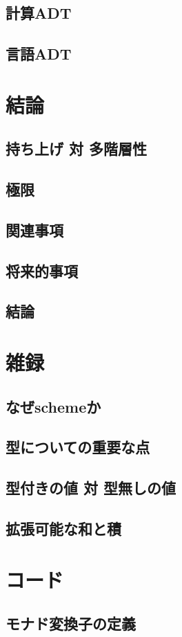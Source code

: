 \documentclass[11pt, oneside]{jsarticle}   	%
\begin{document}
\subsection{ 計算ADT }
\subsection{ 言語ADT }
\section{ 結論 }
\subsection{ 持ち上げ 対 多階層性 }
\subsection{ 極限 }
\subsection{ 関連事項 }
\subsection{ 将来的事項 }
\subsection{ 結論 }

\renewcommand{\thesection}{\Alph{section}}
\renewcommand{\thesubsection}{\thesection-\arabic{subsection}}
\setcounter{section}{0}

\section{ 雑録 }
\subsection{ なぜschemeか }
\subsection{ 型についての重要な点 }
\subsection{ 型付きの値 対 型無しの値 }
\subsection{ 拡張可能な和と積 }
\section{コード}
\subsection{ モナド変換子の定義 }
\end{document}
